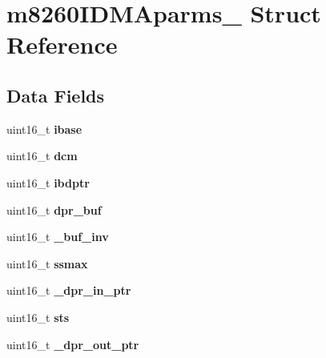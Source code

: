 \hypertarget{structm8260IDMAparms__}{}\section{m8260\+I\+D\+M\+Aparms\+\_\+ Struct Reference}
\label{structm8260IDMAparms__}
\subsection*{Data Fields}
\begin{DoxyCompactItemize}
\item 
\mbox{\label{structm8260IDMAparms___a2020510bc3db8d57e7156539e03c16ee}} 
uint16\+\_\+t {\bfseries ibase}
\item 
\mbox{\label{structm8260IDMAparms___a87b8f359250d7c9d57818fa23d0a3d48}} 
uint16\+\_\+t {\bfseries dcm}
\item 
\mbox{\label{structm8260IDMAparms___a61970d0c2fb76dbf505b822b4bbe50b0}} 
uint16\+\_\+t {\bfseries ibdptr}
\item 
\mbox{\label{structm8260IDMAparms___a73be60a7ab8b29087c54feb82599d535}} 
uint16\+\_\+t {\bfseries dpr\+\_\+buf}
\item 
\mbox{\label{structm8260IDMAparms___a312ae7669695a673ea861b8ab6aa1da7}} 
uint16\+\_\+t {\bfseries \+\_\+buf\+\_\+inv}
\item 
\mbox{\label{structm8260IDMAparms___acd3b86cd915f59af4721f0f816109d94}} 
uint16\+\_\+t {\bfseries ssmax}
\item 
\mbox{\label{structm8260IDMAparms___a3d3198cef009b344fce14f89e4426cf7}} 
uint16\+\_\+t {\bfseries \+\_\+dpr\+\_\+in\+\_\+ptr}
\item 
\mbox{\label{structm8260IDMAparms___afee6c314d022ac3302a4721b4b2e244d}} 
uint16\+\_\+t {\bfseries sts}
\item 
\mbox{\label{structm8260IDMAparms___a26b3d30c033573a42f3c7ed1bcdbedd0}} 
uint16\+\_\+t {\bfseries \+\_\+dpr\+\_\+out\+\_\+ptr}

\end{DoxyCompactItemize}
